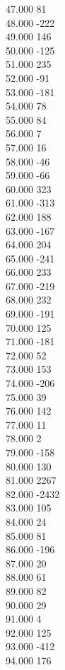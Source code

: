 { 47.000	81 \\
 48.000	-222 \\
 49.000	146 \\
 50.000	-125 \\
 51.000	235 \\
 52.000	-91 \\
 53.000	-181 \\
 54.000	78 \\
 55.000	84 \\
 56.000	7 \\
 57.000	16 \\
 58.000	-46 \\
 59.000	-66 \\
 60.000	323 \\
 61.000	-313 \\
 62.000	188 \\
 63.000	-167 \\
 64.000	204 \\
 65.000	-241 \\
 66.000	233 \\
 67.000	-219 \\
 68.000	232 \\
 69.000	-191 \\
 70.000	125 \\
 71.000	-181 \\
 72.000	52 \\
 73.000	153 \\
 74.000	-206 \\
 75.000	39 \\
 76.000	142 \\
 77.000	11 \\
 78.000	2 \\
 79.000	-158 \\
 80.000	130 \\
 81.000	2267 \\
 82.000	-2432 \\
 83.000	105 \\
 84.000	24 \\
 85.000	81 \\
 86.000	-196 \\
 87.000	20 \\
 88.000	61 \\
 89.000	82 \\
 90.000	29 \\
 91.000	4 \\
 92.000	125 \\
 93.000	-412 \\
 94.000	176 \\
}
